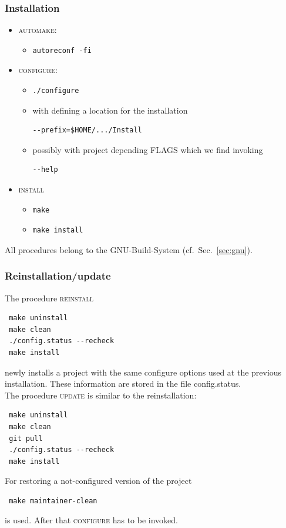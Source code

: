 \subsubsection{Installation}
\begin{itemize}
	\item \textsc{automake}:
	\begin{itemize}
		\item[] \begin{verbatim}autoreconf -fi\end{verbatim}
	\end{itemize}
	\item \textsc{configure}: 
	\begin{itemize}
		\item[] \begin{verbatim}./configure \end{verbatim}
    \item[] with defining a location for the installation 
                \begin{verbatim}--prefix=$HOME/.../Install\end{verbatim}
		\item[] possibly with project depending FLAGS which we find invoking \begin{verbatim}--help\end{verbatim} 
	\end{itemize}
	\item \textsc{install}
	\begin{itemize}	
		\item \begin{verbatim}make\end{verbatim}
		\item \begin{verbatim}make install\end{verbatim}
	\end{itemize}
\end{itemize}
All procedures belong to the GNU-Build-System (cf.~Sec.~\ref{sec:gnu}).

\subsubsection{Reinstallation/update}
The procedure \textsc{reinstall}
\begin{verbatim}
 make uninstall 
 make clean
 ./config.status --recheck
 make install
\end{verbatim}
newly installs a project with the same configure options used at the previous installation. These information are stored in the file config.status.\\ 
%
The procedure \textsc{update} is similar to the reinstallation:
\begin{verbatim}
 make uninstall 
 make clean
 git pull
 ./config.status --recheck
 make install
\end{verbatim}
For restoring a not-configured version of the project
\begin{verbatim}
 make maintainer-clean
\end{verbatim}
is used. After that \textsc{configure} has to be invoked.

